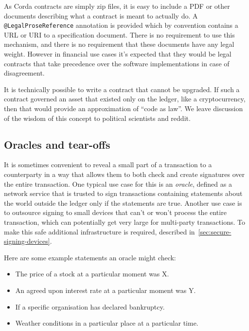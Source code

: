 \documentclass{article}
\begin{document}
As Corda contracts are simply zip files, it is easy to include a PDF or other documents describing what a contract
is meant to actually do. A \texttt{@LegalProseReference} annotation is provided which by convention contains a URL
or URI to a specification document. There is no requirement to use this mechanism, and there is no requirement that
these documents have any legal weight. However in financial use cases it's expected that they would be legal
contracts that take precedence over the software implementations in case of disagreement.

It is technically possible to write a contract that cannot be upgraded. If such a contract governed an asset that
existed only on the ledger, like a cryptocurrency, then that would provide an approximation of ``code as law''. We
leave discussion of the wisdom of this concept to political scientists and reddit.


\subsection{Oracles and tear-offs}\label{sec:tear-offs}

It is sometimes convenient to reveal a small part of a transaction to a counterparty in a way that allows them to
both check and create signatures over the entire transaction. One typical use case for this is an \emph{oracle},
defined as a network service that is trusted to sign transactions containing statements about the world outside the
ledger only if the statements are true. Another use case is to outsource signing to small devices that can't or
won't process the entire transaction, which can potentially get very large for multi-party transactions. To make
this safe additional infrastructure is required, described in~\cref{sec:secure-signing-devices}.

Here are some example statements an oracle might check:

\begin{itemize}
\item The price of a stock at a particular moment was X.
\item An agreed upon interest rate at a particular moment was Y.
\item If a specific organisation has declared bankruptcy.
\item Weather conditions in a particular place at a particular time.
\end{itemize}
\end{document}
